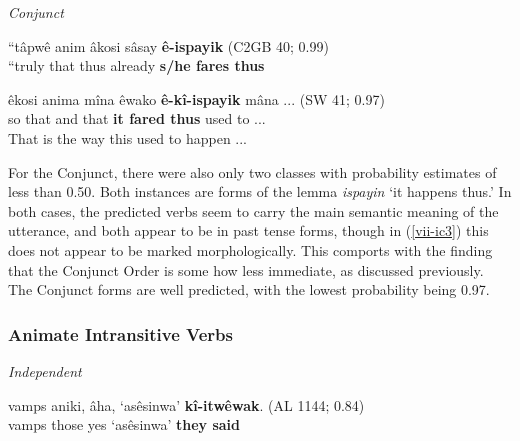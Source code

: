 \vspace{5mm}
\textit{Conjunct}

    \begin{exe}
    \ex
    \gll ``tâpwê anim âkosi sâsay \textbf{ê-ispayik} \tiny{(C2GB 40; 0.99)}\\
    ``truly that thus already \textbf{{s/he fares thus}}\\
    \label{vii-ic3}
    \end{exe}

    \begin{exe}
    \ex
    \gll êkosi anima mîna êwako \textbf{ê-kî-ispayik} mâna ... \tiny{(SW 41; 0.97)}\\
         so that and that {\textbf{it fared thus}} {used to} ...\\
    \trans That is the way this used to happen ... \tiny{\citep[36-37]{Whitecalf1993}}
    \label{vii-ic4}
    \end{exe}
    
For the Conjunct, there were also only two classes with probability estimates of less than 0.50. Both instances are forms of the lemma \textit{ispayin} `it happens thus.' In both cases, the predicted verbs seem to carry the main semantic meaning of the utterance, and both appear to be in past tense forms, though in (\ref{vii-ic3}) this does not appear to be marked morphologically. This comports with the finding that the Conjunct Order is some how less immediate, as discussed previously. The Conjunct forms are well predicted, with the lowest probability being 0.97.
   

\subsubsection{Animate Intransitive Verbs}

\textit{Independent}

    \begin{exe}
    \ex
    \gll vamps aniki, âha, `asêsinwa' \textbf{kî-itwêwak}. \tiny{(AL 1144; 0.84)}\\
         vamps those yes `asêsinwa' {\textbf{they said}} \\
    \trans 
    \label{ic1}
    \end{exe}

